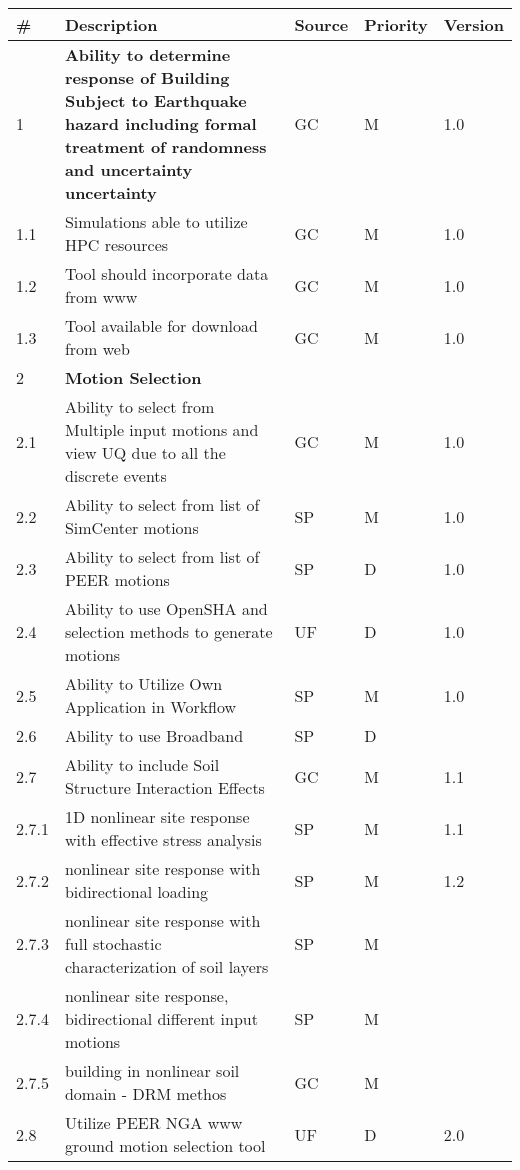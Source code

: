 \begin{longtable}{| p{} | p{} | p{} | p{} |  p{} |}
    \toprule
      \# & Description & Source & Priority & Version \\ \hline
      1 & \textbf{Ability to determine response of Building Subject to Earthquake hazard including formal treatment of randomness and uncertainty uncertainty} & GC & M  & 1.0  \\ \hline
      1.1 & Simulations able to utilize HPC resources & GC & M & 1.0 \\ \hline
      1.2 & Tool should incorporate data from www & GC & M & 1.0 \\ \hline
      1.3 & Tool available for download from web & GC & M & 1.0 \\ \hline
      2 & \textbf{Motion Selection} &  &  \\ \hline
      2.1 & Ability to select from Multiple input motions and view UQ due to all the discrete events & GC & M & 1.0  \\ \hline
      2.2 & Ability to select from list of SimCenter motions & SP & M & 1.0 \\ \hline
      2.3 & Ability to select from list of PEER motions & SP & D & 1.0 \\ \hline
      2.4 & Ability to use OpenSHA and selection methods to generate motions & UF & D & 1.0 \\ \hline
      2.5 & Ability to Utilize Own Application in Workflow & SP & M & 1.0 \\ \hline
      2.6 & Ability to use Broadband & SP & D &  \\ \hline
      2.7  & Ability to include Soil Structure Interaction Effects & GC & M & 1.1 \\  \hline
      2.7.1  & 1D nonlinear site response with effective stress analysis & SP & M & 1.1  \\ \hline
      2.7.2  & nonlinear site response with bidirectional loading & SP & M & 1.2 \\  \hline
      2.7.3  & nonlinear site response with full stochastic characterization of soil layers & SP & M &  \\ \hline
      2.7.4 & nonlinear site response, bidirectional different input motions  & SP & M &  \\  \hline
      2.7.5 & building in nonlinear soil domain - DRM methos & GC  & M &  \\  \hline
      2.8 & Utilize PEER NGA www ground motion selection tool  & UF & D & 2.0 \\ \hline

\end{longtable}
